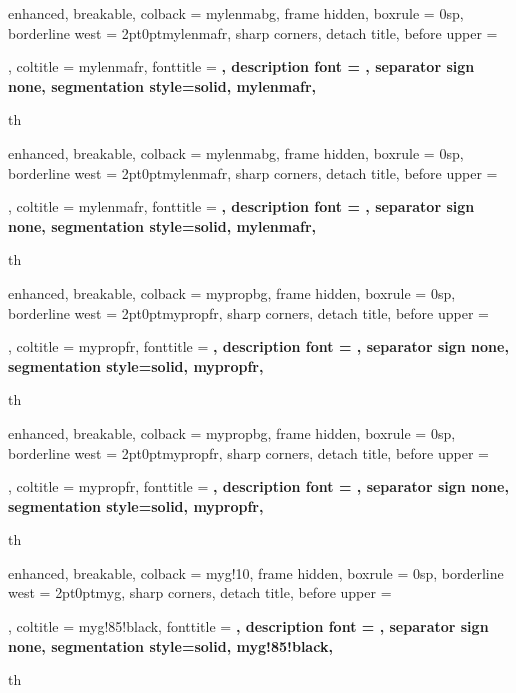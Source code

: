 {%
  enhanced,
  breakable,
  colback = mylenmabg,
  frame hidden,
  boxrule = 0sp,
  borderline west = {2pt}{0pt}{mylenmafr},
  sharp corners,
  detach title,
  before upper = \tcbtitle\par\smallskip,
  coltitle = mylenmafr,
  fonttitle = \bfseries\sffamily,
  description font = \mdseries,
  separator sign none,
  segmentation style={solid, mylenmafr},
}{th}

{%
  enhanced,
  breakable,
  colback = mylenmabg,
  frame hidden,
  boxrule = 0sp,
  borderline west = {2pt}{0pt}{mylenmafr},
  sharp corners,
  detach title,
  before upper = \tcbtitle\par\smallskip,
  coltitle = mylenmafr,
  fonttitle = \bfseries\sffamily,
  description font = \mdseries,
  separator sign none,
  segmentation style={solid, mylenmafr},
}{th}

{%
  enhanced,
  breakable,
  colback = mypropbg,
  frame hidden,
  boxrule = 0sp,
  borderline west = {2pt}{0pt}{mypropfr},
  sharp corners,
  detach title,
  before upper = \tcbtitle\par\smallskip,
  coltitle = mypropfr,
  fonttitle = \bfseries\sffamily,
  description font = \mdseries,
  separator sign none,
  segmentation style={solid, mypropfr},
}{th}

{%
  enhanced,
  breakable,
  colback = mypropbg,
  frame hidden,
  boxrule = 0sp,
  borderline west = {2pt}{0pt}{mypropfr},
  sharp corners,
  detach title,
  before upper = \tcbtitle\par\smallskip,
  coltitle = mypropfr,
  fonttitle = \bfseries\sffamily,
  description font = \mdseries,
  separator sign none,
  segmentation style={solid, mypropfr},
}{th}

{%
  enhanced,
  breakable,
  colback = myg!10,
  frame hidden,
  boxrule = 0sp,
  borderline west = {2pt}{0pt}{myg},
  sharp corners,
  detach title,
  before upper = \tcbtitle\par\smallskip,
  coltitle = myg!85!black,
  fonttitle = \bfseries\sffamily,
  description font = \mdseries,
  separator sign none,
  segmentation style={solid, myg!85!black},
}{th}

